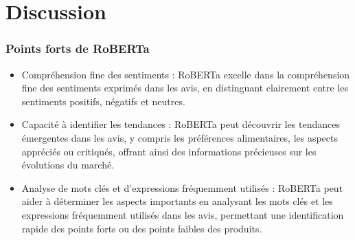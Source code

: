 \section{Discussion}

\begin{frame}
    \frametitle{Points forts de RoBERTa}
    \begin{itemize}
        \item Compréhension fine des sentiments : RoBERTa excelle dans la compréhension fine des sentiments exprimés dans les avis, en distinguant clairement entre les sentiments positifs, négatifs et neutres.

        \item Capacité à identifier les tendances : RoBERTa peut découvrir les tendances émergentes dans les avis, y compris les préférences alimentaires, les aspects appréciés ou critiqués, offrant ainsi des informations précieuses sur les évolutions du marché.

        \item Analyse de mots clés et d'expressions fréquemment utilisés : RoBERTa peut aider à déterminer les aspects importants en analysant les mots clés et les expressions fréquemment utilisés dans les avis, permettant une identification rapide des points forts ou des points faibles des produits.
    \end{itemize}
\end{frame}


